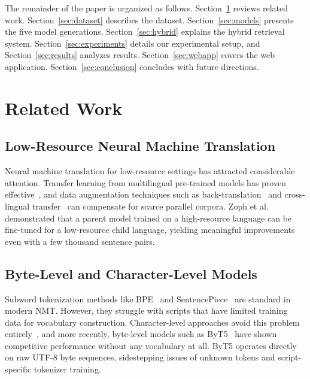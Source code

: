 \documentclass[conference]{IEEEtran}
\begin{document}
The remainder of the paper is organized as follows. Section~\ref{sec:related} reviews related work. Section~\ref{sec:dataset} describes the dataset. Section~\ref{sec:models} presents the five model generations. Section~\ref{sec:hybrid} explains the hybrid retrieval system. Section~\ref{sec:experiments} details our experimental setup, and Section~\ref{sec:results} analyzes results. Section~\ref{sec:webapp} covers the web application. Section~\ref{sec:conclusion} concludes with future directions.

\section{Related Work}\label{sec:related}

\subsection{Low-Resource Neural Machine Translation}

Neural machine translation for low-resource settings has attracted considerable attention. Transfer learning from multilingual pre-trained models has proven effective~\cite{liu2020mbart, xue2021mt5}, and data augmentation techniques such as back-translation~\cite{sennrich2016backtranslation} and cross-lingual transfer~\cite{neubig2018rapid} can compensate for scarce parallel corpora. Zoph et al.~\cite{zoph2016transfer} demonstrated that a parent model trained on a high-resource language can be fine-tuned for a low-resource child language, yielding meaningful improvements even with a few thousand sentence pairs.

\subsection{Byte-Level and Character-Level Models}

Subword tokenization methods like BPE~\cite{sennrich2016bpe} and SentencePiece~\cite{kudo2018sentencepiece} are standard in modern NMT. However, they struggle with scripts that have limited training data for vocabulary construction. Character-level approaches avoid this problem entirely~\cite{lee2017fully}, and more recently, byte-level models such as ByT5~\cite{xue2022byt5} have shown competitive performance without any vocabulary at all. ByT5 operates directly on raw UTF-8 byte sequences, sidestepping issues of unknown tokens and script-specific tokenizer training.
\end{document}
